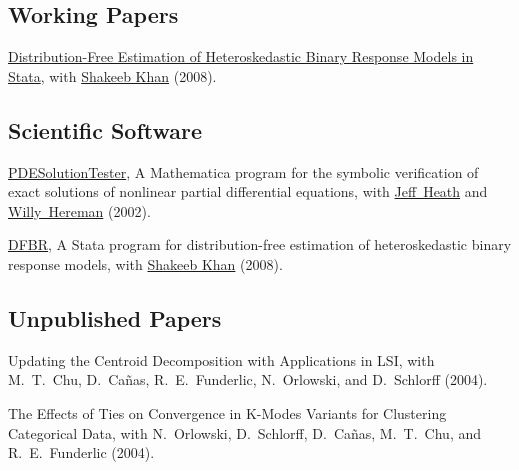 \documentclass[letterpaper]{article}
\renewenvironment{itemize}{
  \begin{list}{}{
    \setlength{\leftmargin}{1em}
  }
}{
  \end{list}
}
\begin{document}
\subsection*{Working Papers}

\begin{itemize}
\item \href{http://jblevins.org/research/dfbr}{Distribution-Free
    Estimation of Heteroskedastic Binary Response Models in Stata}, with
  \href{http://www.econ.duke.edu/~shakeebk/}{Shakeeb Khan} (2008).
\end{itemize}



\subsection*{Scientific Software}

\begin{itemize}
\item \href{http://jblevins.org/research/pdest}{PDESolutionTester}, A
  Mathematica program for the symbolic verification of exact solutions
  of nonlinear partial differential equations, with
  \href{http://web.centre.edu/jeffrey.heath/}{Jeff\ Heath} and
  \href{http://www.mines.edu/fs_home/whereman/}{Willy\ Hereman} (2002).
\item \href{http://jblevins.org/research/dfbr}{DFBR}, A Stata program
  for distribution-free estimation of heteroskedastic binary response
  models, with
  \href{http://www.econ.duke.edu/~shakeebk/}{Shakeeb Khan} (2008).
\end{itemize}

\subsection*{Unpublished Papers}

\begin{itemize}
\item Updating the Centroid Decomposition with Applications in LSI,
  with M.\ T.\ Chu, D.\ Ca\~{n}as, R.\ E.\ Funderlic, N.\ Orlowski, and
  D.\ Schlorff (2004).

\item The Effects of Ties on Convergence in K-Modes Variants for
  Clustering Categorical Data, with N.\ Orlowski, D.\ Schlorff, D.\
  Ca\~{n}as, M.\ T.\ Chu, and R.\ E.\ Funderlic (2004).
\end{itemize}
\end{document}
